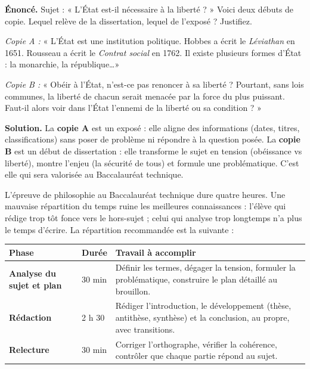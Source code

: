 \documentclass[11pt]{article}
\newcounter{popsec}
\newcounter{popsub}
\newcommand{\courssub}[1]{%
  \stepcounter{popsub}%
  \par\vspace{9pt}\noindent{\popxbold\fontsize{11.5}{13}\selectfont\color{popink}{\color{poporange}\thepopsec.\thepopsub}\hspace{6pt}#1}\par\nopagebreak\vspace{4pt}
}
\begin{document}
\begin{exoresolu}
\textbf{Énoncé.} Sujet : « L'État est-il nécessaire à la liberté ? » Voici deux débuts de copie. Lequel relève de la dissertation, lequel de l'exposé ? Justifiez.

\emph{Copie A :} « L'État est une institution politique. Hobbes a écrit le \emph{Léviathan} en 1651. Rousseau a écrit le \emph{Contrat social} en 1762. Il existe plusieurs formes d'État : la monarchie, la république\ldots »

\emph{Copie B :} « Obéir à l'État, n'est-ce pas renoncer à sa liberté ? Pourtant, sans lois communes, la liberté de chacun serait menacée par la force du plus puissant. Faut-il alors voir dans l'État l'ennemi de la liberté ou sa condition ? »

\tcblower
\textbf{Solution.} La \textbf{copie A} est un exposé : elle aligne des informations (dates, titres, classifications) sans poser de problème ni répondre à la question posée. La \textbf{copie B} est un début de dissertation : elle transforme le sujet en tension (obéissance vs liberté), montre l'enjeu (la sécurité de tous) et formule une problématique. C'est elle qui sera valorisée au Baccalauréat technique.
\end{exoresolu}

\courssub{La gestion du temps à l'examen}

L'épreuve de philosophie au Baccalauréat technique dure quatre heures. Une mauvaise répartition du temps ruine les meilleures connaissances : l'élève qui rédige trop tôt fonce vers le hors-sujet ; celui qui analyse trop longtemps n'a plus le temps d'écrire. La répartition recommandée est la suivante :

\begin{center}
\begin{tabularx}{\linewidth}{|l|X|X|}
\hline
\rowcolor{popgreenL} \textbf{Phase} & \textbf{Durée} & \textbf{Travail à accomplir} \\
\hline
\textbf{Analyse du sujet et plan} & 30 min & Définir les termes, dégager la tension, formuler la problématique, construire le plan détaillé au brouillon. \\
\hline
\textbf{Rédaction} & 2 h 30 & Rédiger l'introduction, le développement (thèse, antithèse, synthèse) et la conclusion, au propre, avec transitions. \\
\hline
\textbf{Relecture} & 30 min & Corriger l'orthographe, vérifier la cohérence, contrôler que chaque partie répond au sujet. \\
\hline
\end{tabularx}
\end{center}
\end{document}
